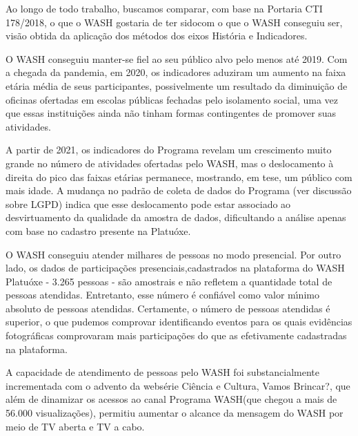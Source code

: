 \documentclass[
12pt,		%
openright,	%
twoside,  %
a4paper,			%
chapter=TITLE,		%
english,			%
french,				%
spanish,			%
brazil				%
]{USPSC-classe/USPSC}
\begin{document}
Ao longo de todo trabalho, buscamos comparar, com base na Portaria CTI 178/2018, \textquotedbl o que o WASH gostaria de ter sido\textquotedbl  com \textquotedbl o que o WASH conseguiu ser\textquotedbl , vis\~ao obtida da aplica\c{c}\~ao dos m\'etodos dos eixos Hist\'oria e Indicadores.


















\begin{alineas}
\item O WASH conseguiu manter-se fiel ao seu p\'ublico alvo pelo menos at\'e 2019. Com a chegada da pandemia, em 2020, os indicadores  aduziram um aumento na faixa et\'aria m\'edia de seus participantes, possivelmente um resultado da diminui\c{c}\~ao de oficinas ofertadas em escolas p\'ublicas fechadas pelo isolamento social, uma vez que essas institui\c{c}\~oes ainda n\~ao tinham formas contingentes de promover suas atividades.
\item A partir de 2021, os indicadores do Programa revelam um crescimento muito grande no n\'umero de atividades ofertadas pelo WASH, mas o deslocamento \`a direita do pico das faixas et\'arias permanece, mostrando, em tese, um p\'ublico com mais idade. A mudan\c{c}a no padr\~ao de coleta de dados do Programa (ver discuss\~ao sobre LGPD) indica que esse deslocamento pode estar associado ao desvirtuamento da qualidade da amostra de dados, dificultando a an\'alise apenas com base no cadastro presente na Platu\'oxe.
\item O WASH conseguiu atender milhares de pessoas no modo presencial. Por outro lado, os dados de participa\c{c}\~oes presenciais,cadastrados na plataforma do WASH Platu\'oxe - 3.265 pessoas - s\~ao amostrais e n\~ao refletem a quantidade total de pessoas atendidas. Entretanto, esse n\'umero \'e confi\'avel como valor m\'{\i}nimo absoluto de pessoas atendidas. Certamente, o n\'umero de pessoas atendidas \'e  superior, o que pudemos comprovar identificando eventos para os quais evid\^encias fotogr\'aficas comprovaram mais participa\c{c}\~oes do que as efetivamente cadastradas na plataforma.
\item A capacidade de atendimento de pessoas pelo WASH foi substancialmente incrementada com o advento da webs\'erie \textquotedbl Ci\^encia e Cultura, Vamos Brincar?\textquotedbl , que al\'em de dinamizar os acessos ao canal \textquotedbl Programa WASH\textquotedbl  (que chegou a mais de 56.000 visualiza\c{c}\~oes), permitiu  aumentar o alcance da mensagem do WASH por meio de TV aberta e TV a cabo.

\end{alineas}
\end{document}
